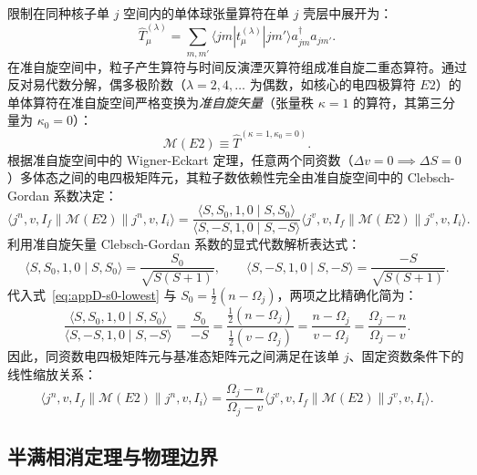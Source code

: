 限制在同种核子单 $j$ 空间内的单体球张量算符在单 $j$ 壳层中展开为：
\begin{equation}\label{eq:appD-one-body-em-op}
\hat{T}^{(\lambda)}_\mu = \sum_{m, m'} \langle j m | t^{(\lambda)}_\mu | j m' \rangle a_{jm}^\dagger a_{jm'}.
\end{equation}
在准自旋空间中，粒子产生算符与时间反演湮灭算符组成准自旋二重态算符。通过反对易代数分解，偶多极阶数（$\lambda = 2, 4, \dots$ 为偶数，如核心的电四极算符 $E2$）的单体算符在准自旋空间严格变换为\emph{准自旋矢量}（张量秩 $\kappa = 1$ 的算符，其第三分量为 $\kappa_0 = 0$）：
\begin{equation}\label{eq:appD-e2-quasispin-vector}
\mathcal{M}(E2) \equiv \hat{T}^{(\kappa=1, \kappa_0=0)}.
\end{equation}
根据准自旋空间中的 Wigner-Eckart 定理，任意两个同资数（$\Delta v = 0 \implies \Delta S = 0$）多体态之间的电四极矩阵元，其粒子数依赖性完全由准自旋空间中的 Clebsch-Gordan 系数决定：
\begin{equation}\label{eq:appD-wigner-eckart-quasispin}
\langle j^n, v, I_f \| \mathcal{M}(E2) \| j^n, v, I_i \rangle = \frac{\langle S, S_0, 1, 0 \mid S, S_0 \rangle}{\langle S, -S, 1, 0 \mid S, -S \rangle} \langle j^v, v, I_f \| \mathcal{M}(E2) \| j^v, v, I_i \rangle.
\end{equation}
利用准自旋矢量 Clebsch-Gordan 系数的显式代数解析表达式：
\begin{equation}\label{eq:appD-cg-analytical}
\langle S, S_0, 1, 0 \mid S, S_0 \rangle = \frac{S_0}{\sqrt{S(S+1)}}, \qquad \langle S, -S, 1, 0 \mid S, -S \rangle = \frac{-S}{\sqrt{S(S+1)}}.
\end{equation}
代入式~\eqref{eq:appD-s0-lowest} 与 $S_0 = \frac{1}{2}(n - \Omega_j)$，两项之比精确化简为：
\begin{equation}\label{eq:appD-cg-ratio}
\frac{\langle S, S_0, 1, 0 \mid S, S_0 \rangle}{\langle S, -S, 1, 0 \mid S, -S \rangle} = \frac{S_0}{-S} = \frac{\frac{1}{2}(n - \Omega_j)}{\frac{1}{2}(v - \Omega_j)} = \frac{n - \Omega_j}{v - \Omega_j} = \frac{\Omega_j - n}{\Omega_j - v}.
\end{equation}
因此，同资数电四极矩阵元与基准态矩阵元之间满足在该单 $j$、固定资数条件下的线性缩放关系：
\begin{equation}\label{eq:appD-seniority-e2-scaling}
\langle j^n, v, I_f \| \mathcal{M}(E2) \| j^n, v, I_i \rangle = \frac{\Omega_j - n}{\Omega_j - v} \langle j^v, v, I_f \| \mathcal{M}(E2) \| j^v, v, I_i \rangle.
\end{equation}

\subsection{半满相消定理与物理边界}

